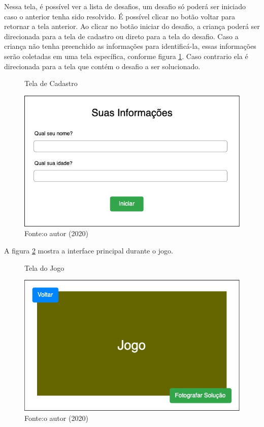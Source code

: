     Nessa tela, é possível ver a lista de desafios, um desafio só poderá ser iniciado caso o anterior tenha sido resolvido.
    É possível clicar no botão voltar para retornar a tela anterior.
    Ao clicar no botão iniciar do desafio, a criança poderá ser direcionada para a tela de cadastro ou direto para a tela do desafio.
    Caso a criança não tenha preenchido as informações para identificá-la, essas informações serão coletadas em uma tela específica, conforme figura \ref{figura:cadastro}. Caso contrario ela é direcionada para a tela que contém o desafio a ser solucionado.
    
    \begin{figure}[h!]
        \centering
        \caption{Tela de Cadastro}
        \includegraphics[width=12cm]{images/cap3/informacoes_usuario.jpg}
        \caption*{Fonte:o autor (2020)}
        \label{figura:cadastro}
    \end{figure}
    
    A figura \ref{figura:tela_jogo} mostra a interface principal durante o jogo.
    
    \begin{figure}[h!]
        \centering
        \caption{Tela do Jogo}
        \includegraphics[width=12cm]{images/cap3/tela_jogo.jpg}
        \caption*{Fonte:o autor (2020)}
        \label{figura:tela_jogo}
    \end{figure}
    
